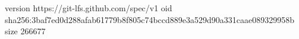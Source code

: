 version https://git-lfs.github.com/spec/v1
oid sha256:3baf7ed0d288afab61779b8f805c74bccd889e3a529d90a331caae089329958b
size 266677
